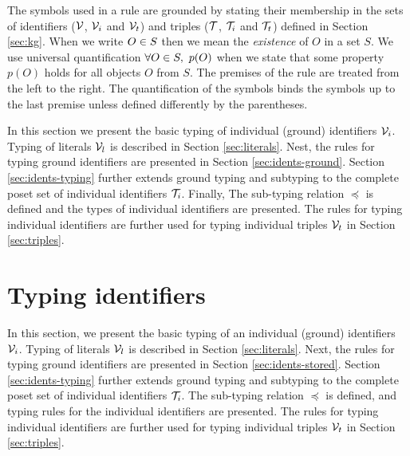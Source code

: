 \documentclass[runningheads]{llncs}
\newcommand{\V}{{\cal V}}
\newcommand{\T}{{\cal T}}
\newcommand{\memo}[1]{}
\begin{document}
The symbols used in a rule are grounded by stating their membership in
the sets of identifiers ($\V$, $\V_i$ and $\V_t$) and triples ($\T$,
$\T_i$ and $\T_t$) defined in Section \ref{sec:kg}. When we write
$O\in\/S$ then we mean the \emph{existence} of $O$ in a set $S$. We
use universal quantification $\forall\/O\in\/S,\ p(O)$ when we state
that some property $p(O)$ holds for all objects $O$ from $S$. The
premises of the rule are treated from the left to the right. The
quantification of the symbols binds the symbols up to the last premise
unless defined differently by the parentheses.

\memo{
Similar to \cite{Dunfield2021}, we differ between two interpretations
of rules. First, the \emph{generator} view of rules is the forward
interpretation where rules infer the types from the types derived by
premises. Second, the \emph{type-checking} view of the rules is the
backward interpretation. Given the expression and its type, the rules
are applied backwards to verify that the expression has that type.}
In this section we present the basic typing of individual (ground)
identifiers $\V_i$. Typing of literals $\V_l$ is described in Section
\ref{sec:literals}. Nest, the rules for typing ground identifiers are
presented in Section \ref{sec:idents-ground}. Section
\ref{sec:idents-typing} further extends ground typing and subtyping to
the complete poset set of individual identifiers $\T_i$. Finally, The
sub-typing relation $\preceq$ is defined and the types of individual
identifiers are presented. The rules for typing individual identifiers
are further used for typing individual triples $\V_t$ in Section
\ref{sec:triples}.





\section{Typing identifiers\label{sec:typ-idents}}

In this section, we present the basic typing of an individual (ground)
identifiers $\V_i$. Typing of literals $\V_l$ is described in Section
\ref{sec:literals}. Next, the rules for typing ground identifiers are
presented in Section \ref{sec:idents-stored}. Section
\ref{sec:idents-typing} further extends ground typing and subtyping to
the complete poset set of individual identifiers $\T_i$. The
sub-typing relation $\preceq$ is defined, and typing rules for the
individual identifiers are presented. The rules for typing individual
identifiers are further used for typing individual triples $\V_t$ in
Section \ref{sec:triples}.
\end{document}

